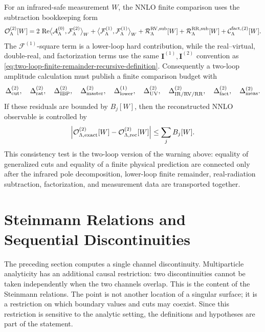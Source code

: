 \begin{controlledapproximation}
For an infrared-safe measurement \(W\), the NNLO finite comparison uses the
subtraction bookkeeping form
\begin{equation}
  \mathcal O_\Lambda^{(2)}[W]
  =
  2\,\operatorname{Re}
  \bigl\langle
    \mathcal A_\Lambda^{(0)},\mathcal F_\Lambda^{(2)}
  \bigr\rangle_W
  +
  \bigl\langle
    \mathcal F_\Lambda^{(1)},\mathcal F_\Lambda^{(1)}
  \bigr\rangle_W
  +
  \mathcal R_\Lambda^{{\rm RV,sub}}[W]
  +
  \mathcal R_\Lambda^{{\rm RR,sub}}[W]
  +
  \mathcal C_\Lambda^{{\rm fact},(2)}[W].
  \label{eq:two-loop-observable-from-finite-remainders}
\end{equation}
The \(\mathcal F^{(1)}\)-square term is a lower-loop hard contribution, while
the real--virtual, double-real, and factorization terms use the same
\(\mathbf I^{(1)},\mathbf I^{(2)}\) convention as
\eqref{eq:two-loop-finite-remainder-recursive-definition}.  Consequently a
two-loop amplitude calculation must publish a finite comparison budget with
\[
  \Delta_{\rm cut}^{(2)},\quad
  \Delta_{\rm rat}^{(2)},\quad
  \Delta_{\rm IBP}^{(2)},\quad
  \Delta_{\rm master}^{(2)},\quad
  \Delta_{\rm lower}^{(1)},\quad
  \Delta_{\rm UV}^{(2)},\quad
  \Delta_{\rm IR/RV/RR}^{(2)},\quad
  \Delta_{\rm fact}^{(2)},\quad
  \Delta_{\rm meas}^{(2)} .
\]
If these residuals are bounded by \(B_j[W]\), then the reconstructed NNLO
observable is controlled by
\begin{equation}
  \left|
    \mathcal O_{\Lambda,{\rm exact}}^{(2)}[W]
    -
    \mathcal O_{\Lambda,{\rm rec}}^{(2)}[W]
  \right|
  \le
  \sum_j B_j[W] .
  \label{eq:two-loop-observable-reconstruction-bound}
\end{equation}
This consistency test is the two-loop version of the warning above: equality
of generalized cuts and equality of a finite physical prediction are connected
only after the infrared pole decomposition, lower-loop finite remainder,
real-radiation subtraction, factorization, and measurement data are transported
together.
\end{controlledapproximation}

\section{Steinmann Relations and Sequential Discontinuities}
\label{sec:steinmann-sequential-discontinuities}

The preceding section computes a single channel discontinuity.  Multiparticle
analyticity has an additional causal restriction: two discontinuities cannot be
taken independently when the two channels overlap.  This is the content of the
Steinmann relations.  The point is not another location of a singular surface;
it is a restriction on which boundary values and cuts may coexist.  Since this
restriction is sensitive to the analytic setting, the definitions and
hypotheses are part of the statement.


